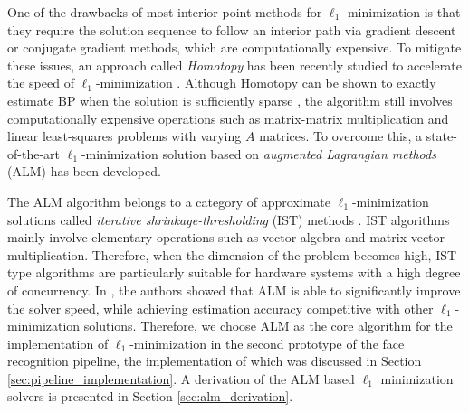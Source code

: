 One of the drawbacks of most interior-point methods for $\ell_1$-minimization
is that they require the solution sequence to follow an interior path via
gradient descent or conjugate gradient methods, which are computationally
expensive.  To mitigate these issues, an approach called \emph{Homotopy} has
been recently studied to accelerate the speed of $\ell_1$-minimization
\cite{OsborneM2000,EfronB2004,MalioutovD2005,DonohoD2006}.  Although Homotopy
can be shown to exactly estimate BP when the solution is sufficiently sparse
\cite{DonohoD2006}, the algorithm still involves computationally expensive
operations such as matrix-matrix multiplication and linear least-squares
problems with varying $A$ matrices.  To overcome this, a state-of-the-art
$\ell_1$-minimization solution based on \emph{augmented Lagrangian methods}
(ALM) \cite{BertsekasD2003,YangA2010-ICIP} has been developed.

The ALM algorithm belongs to a category of approximate $\ell_1$-minimization
solutions called \emph{iterative shrinkage-thresholding} (IST) methods
\cite{WrightS2008,BeckA2009}.  IST algorithms mainly involve elementary
operations such as vector algebra and matrix-vector multiplication. Therefore,
when the dimension of the problem becomes high, IST-type algorithms are
particularly suitable for hardware systems with a high degree of concurrency.
In \cite{YangA2010-ICIP}, the authors showed that ALM is able to significantly
improve the solver speed, while achieving estimation accuracy competitive with
other $\ell_1$-minimization solutions. Therefore, we choose ALM as the core
algorithm for the implementation of $\ell_1$-minimization in the second
prototype of the face recognition pipeline, the implementation of which was
discussed in Section \ref{sec:pipeline_implementation}.  A derivation of the
ALM based $\ell_1$ minimization solvers is presented in Section
\ref{sec:alm_derivation}.



